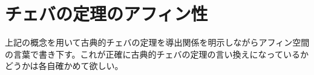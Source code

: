 \documentclass[a4paper,12pt]{bxjsbook}
\newlength{\customindent}
\newenvironment{body}{
  \par
  \begingroup
  \setlength{\leftskip}{\customindent}
  \setlength{\rightskip}{0pt}
  \setlength{\parindent}{1em}
  \setlength{\displayindent}{\customindent}
  \setlength{\displaywidth}{\dimexpr\linewidth-\customindent\relax}
}{
  \par
  \endgroup
}
\theoremstyle{theorem}
\newtheorem{remark}[theorem]{注意}
\begin{document}

    \section{チェバの定理のアフィン性}

    \begin{body}
        \indent 上記の概念を用いて古典的チェバの定理を導出関係を明示しながらアフィン空間の言葉で書き下す。これが正確に古典的チェバの定理の言い換えになっているかどうかは各自確かめて欲しい。
    \end{body}
\end{document}
